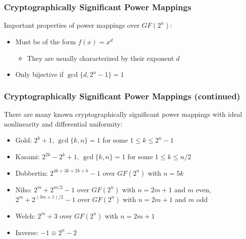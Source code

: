 \documentclass[handout,10pt]{beamer}
\begin{document}
\begin{frame}
	\frametitle{Cryptographically Significant Power Mappings}
	Important properties of power mappings over $GF(2^n)$:
	\begin{itemize}
		\item Must be of the form $f(x) = x^d$
		\begin{itemize}
			\item They are usually characterized by their exponent $d$
		\end{itemize}
		\item Only bijective if $\gcd\{d, 2^n - 1\} = 1$
	\end{itemize}
\end{frame}

\begin{frame}
	\frametitle{Cryptographically Significant Power Mappings (continued)}
	There are many known cryptographically significant power mappings with ideal nonlinearity and differential uniformity:
	\begin{itemize}
		\item Gold: $2^{k} + 1$, $\gcd\{k,n\} = 1$ for some $1 \leq k \leq 2^{n} - 1$
		\item Kasami: $2^{2k} - 2^k + 1$, $\gcd\{k,n\} = 1$ for some $1 \leq k \leq n/2$
		\item Dobbertin: $2^{4k + 3k + 2k + k} - 1$ over $GF(2^n)$ with $n = 5k$
		\item Niho: $2^{m} + 2^{m/2} - 1$ over $GF(2^n)$ with $n = 2m + 1$ and $m$ even, $2^{m} + 2^{(3m + 1)/2} - 1$ over $GF(2^n)$ with $n = 2m + 1$ and $m$ odd
		\item Welch: $2^m + 3$ over $GF(2^n)$ with $n = 2m + 1$
		\item Inverse: $-1 \equiv 2^n - 2$
	\end{itemize}
\end{frame}

\end{document}
